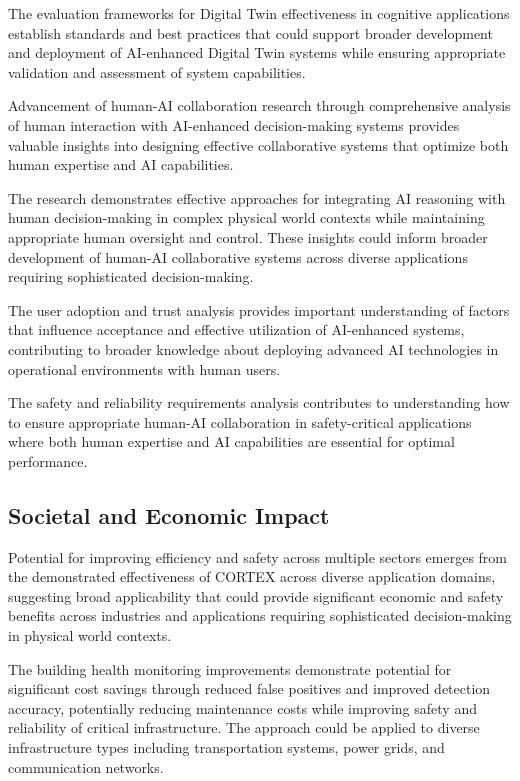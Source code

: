 The evaluation frameworks for Digital Twin effectiveness in cognitive applications establish standards and best practices that could support broader development and deployment of AI-enhanced Digital Twin systems while ensuring appropriate validation and assessment of system capabilities.

Advancement of human-AI collaboration research through comprehensive analysis of human interaction with AI-enhanced decision-making systems provides valuable insights into designing effective collaborative systems that optimize both human expertise and AI capabilities.

The research demonstrates effective approaches for integrating AI reasoning with human decision-making in complex physical world contexts while maintaining appropriate human oversight and control. These insights could inform broader development of human-AI collaborative systems across diverse applications requiring sophisticated decision-making.

The user adoption and trust analysis provides important understanding of factors that influence acceptance and effective utilization of AI-enhanced systems, contributing to broader knowledge about deploying advanced AI technologies in operational environments with human users.

The safety and reliability requirements analysis contributes to understanding how to ensure appropriate human-AI collaboration in safety-critical applications where both human expertise and AI capabilities are essential for optimal performance.

\subsection{Societal and Economic Impact}

Potential for improving efficiency and safety across multiple sectors emerges from the demonstrated effectiveness of CORTEX across diverse application domains, suggesting broad applicability that could provide significant economic and safety benefits across industries and applications requiring sophisticated decision-making in physical world contexts.

The building health monitoring improvements demonstrate potential for significant cost savings through reduced false positives and improved detection accuracy, potentially reducing maintenance costs while improving safety and reliability of critical infrastructure. The approach could be applied to diverse infrastructure types including transportation systems, power grids, and communication networks.


